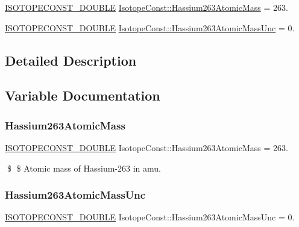 \begin{DoxyCompactItemize}
\item 
\mbox{\hyperlink{group___isotope_const-_macros_ga8f45a7272ce02c0b4c65c44636ed719a}{I\+S\+O\+T\+O\+P\+E\+C\+O\+N\+S\+T\+\_\+\+D\+O\+U\+B\+LE}} \mbox{\hyperlink{group___isotope_const-_hassium-_hs263_ga638a501cec3517caae11278b92e46565}{Isotope\+Const\+::\+Hassium263\+Atomic\+Mass}} = 263.
\item 
\mbox{\hyperlink{group___isotope_const-_macros_ga8f45a7272ce02c0b4c65c44636ed719a}{I\+S\+O\+T\+O\+P\+E\+C\+O\+N\+S\+T\+\_\+\+D\+O\+U\+B\+LE}} \mbox{\hyperlink{group___isotope_const-_hassium-_hs263_gab8f1d10f5d4b6c623333bbf82651fb9a}{Isotope\+Const\+::\+Hassium263\+Atomic\+Mass\+Unc}} = 0.
\end{DoxyCompactItemize}


\subsection{Detailed Description}


\subsection{Variable Documentation}
\mbox{\label{group___isotope_const-_hassium-_hs263_ga638a501cec3517caae11278b92e46565}} 
\subsubsection{\texorpdfstring{Hassium263\+Atomic\+Mass}{Hassium263AtomicMass}}
{\footnotesize\ttfamily \mbox{\hyperlink{group___isotope_const-_macros_ga8f45a7272ce02c0b4c65c44636ed719a}{I\+S\+O\+T\+O\+P\+E\+C\+O\+N\+S\+T\+\_\+\+D\+O\+U\+B\+LE}} Isotope\+Const\+::\+Hassium263\+Atomic\+Mass = 263.}

\$ \$ Atomic mass of Hassium-\/263 in amu. \mbox{\label{group___isotope_const-_hassium-_hs263_gab8f1d10f5d4b6c623333bbf82651fb9a}} 
\subsubsection{\texorpdfstring{Hassium263\+Atomic\+Mass\+Unc}{Hassium263AtomicMassUnc}}
{\footnotesize\ttfamily \mbox{\hyperlink{group___isotope_const-_macros_ga8f45a7272ce02c0b4c65c44636ed719a}{I\+S\+O\+T\+O\+P\+E\+C\+O\+N\+S\+T\+\_\+\+D\+O\+U\+B\+LE}} Isotope\+Const\+::\+Hassium263\+Atomic\+Mass\+Unc = 0.}

